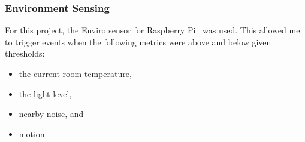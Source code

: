 \subsubsection{Environment Sensing}

For this project, the Enviro sensor for Raspberry Pi~\cite{} was used. This allowed me to trigger events when the following metrics were above and below given thresholds:

\vspace{-2mm}
\begin{itemize}[noitemsep]
  \item the current room temperature,
  \item the light level,
  \item nearby noise, and
  \item motion.
\end{itemize}
